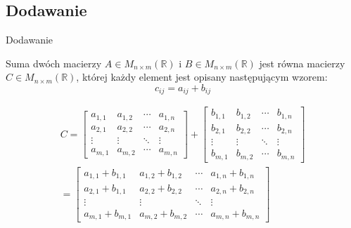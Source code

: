 \documentclass[polish,10pt]{beamer}
\begin{document}
\subsection{Dodawanie}
\begin{frame}{Dodawanie}
    \begin{definition}
        Suma dwóch macierzy $A \in M_{n \times m}(\mathbb{R})$ i $B \in M_{n \times m}(\mathbb{R})$ jest równa macierzy $C \in M_{n \times m}(\mathbb{R})$, której każdy element jest opisany następującym wzorem:
        \begin{equation*}
            c_{i j} = a_{i j} + b_{i j}
        \end{equation*}
    \end{definition}
    
    \begin{gather*}
        C= \begin{bmatrix}
                a_{1,1} & a_{1,2} & \cdots & a_{1,n} \\
                a_{2,1} & a_{2,2} & \cdots & a_{2,n} \\
                \vdots  & \vdots  & \ddots & \vdots  \\
                a_{m,1} & a_{m,2} & \cdots & a_{m,n} 
            \end{bmatrix}
        +
            \begin{bmatrix}
                b_{1,1} & b_{1,2} & \cdots & b_{1,n} \\
                b_{2,1} & b_{2,2} & \cdots & b_{2,n} \\
                \vdots  & \vdots  & \ddots & \vdots  \\
                b_{m,1} & b_{m,2} & \cdots & b_{m,n} 
            \end{bmatrix}\\
        =   \begin{bmatrix}
                a_{1,1} + b_{1,1} & a_{1,2} + b_{1,2} & \cdots& a_{1,n} + b_{1,n} \\
                a_{2,1} + b_{1,1} & a_{2,2} + b_{2,2} & \cdots& a_{2,n} + b_{2,n} \\
                \vdots  & \vdots  & \ddots & \vdots  \\
                a_{m,1} + b_{m,1} & a_{m,2} + b_{m,2} & \cdots& a_{m,n} + b_{m,n}
            \end{bmatrix}
    \end{gather*}
\end{frame}
\end{document}

